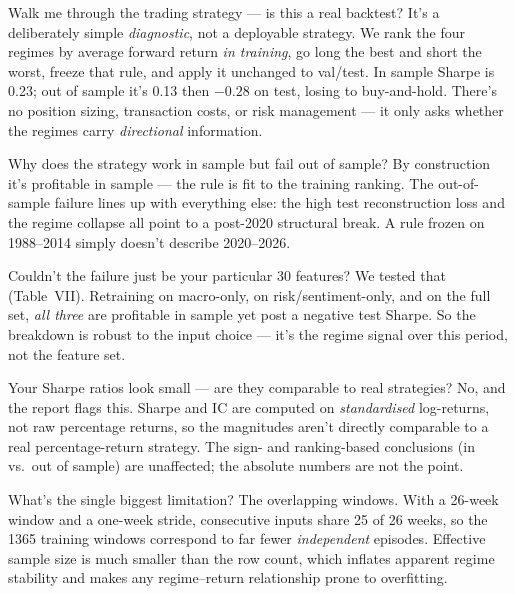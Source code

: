 \documentclass[11pt]{article}
\begin{document}
\begin{qa}{Walk me through the trading strategy --- is this a real backtest?}
It's a deliberately simple \emph{diagnostic}, not a deployable strategy. We rank the
four regimes by average forward return \emph{in training}, go long the best and short
the worst, freeze that rule, and apply it unchanged to val/test. In sample Sharpe is
0.23; out of sample it's 0.13 then $-0.28$ on test, losing to buy-and-hold. There's
no position sizing, transaction costs, or risk management --- it only asks whether the
regimes carry \emph{directional} information.
\end{qa}

\begin{qa}{Why does the strategy work in sample but fail out of sample?}
By construction it's profitable in sample --- the rule is fit to the training
ranking. The out-of-sample failure lines up with everything else: the high test
reconstruction loss and the regime collapse all point to a post-2020 structural
break. A rule frozen on 1988–2014 simply doesn't describe 2020–2026.
\end{qa}

\begin{qa}{Couldn't the failure just be your particular 30 features?}
We tested that (Table~VII). Retraining on macro-only, on risk/sentiment-only, and on
the full set, \emph{all three} are profitable in sample yet post a negative test
Sharpe. So the breakdown is robust to the input choice --- it's the regime signal
over this period, not the feature set.
\end{qa}

\begin{qa}{Your Sharpe ratios look small --- are they comparable to real strategies?}
No, and the report flags this. Sharpe and IC are computed on \emph{standardised}
log-returns, not raw percentage returns, so the magnitudes aren't directly comparable
to a real percentage-return strategy. The sign- and ranking-based conclusions (in vs.\
out of sample) are unaffected; the absolute numbers are not the point.
\end{qa}

\begin{qa}{What's the single biggest limitation?}
The overlapping windows. With a 26-week window and a one-week stride, consecutive
inputs share 25 of 26 weeks, so the 1365 training windows correspond to far fewer
\emph{independent} episodes. Effective sample size is much smaller than the row
count, which inflates apparent regime stability and makes any regime–return
relationship prone to overfitting.
\end{qa}
\end{document}
